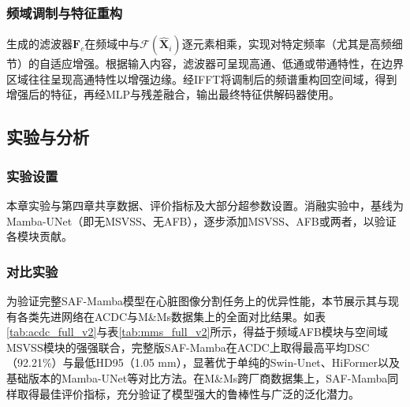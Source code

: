 \documentclass[12pt, a4paper, twoside]{article}
\begin{document}
\subsubsection{频域调制与特征重构}

生成的滤波器$\mathbf{F}_c$在频域中与$\mathcal{F}(\hat{\mathbf{X}}_i)$逐元素相乘，实现对特定频率（尤其是高频细节）的自适应增强。根据输入内容，滤波器可呈现高通、低通或带通特性，在边界区域往往呈现高通特性以增强边缘。经IFFT将调制后的频谱重构回空间域，得到增强后的特征，再经MLP与残差融合，输出最终特征供解码器使用。

\subsection{实验与分析}

\subsubsection{实验设置}

本章实验与第四章共享数据、评价指标及大部分超参数设置。消融实验中，基线为Mamba-UNet（即无MSVSS、无AFB），逐步添加MSVSS、AFB或两者，以验证各模块贡献。

\subsubsection{对比实验}

为验证完整SAF-Mamba模型在心脏图像分割任务上的优异性能，本节展示其与现有各类先进网络在ACDC与M\&Ms数据集上的全面对比结果。如表\ref{tab:acdc_full_v2}与表\ref{tab:mms_full_v2}所示，得益于频域AFB模块与空间域MSVSS模块的强强联合，完整版SAF-Mamba在ACDC上取得最高平均DSC（92.21\%）与最低HD95（1.05 mm），显著优于单纯的Swin-Unet、HiFormer以及基础版本的Mamba-UNet等对比方法。在M\&Ms跨厂商数据集上，SAF-Mamba同样取得最佳评价指标，充分验证了模型强大的鲁棒性与广泛的泛化潜力。
\end{document}
